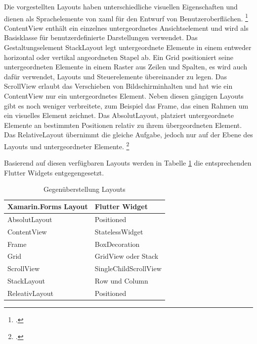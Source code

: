 Die vorgestellten Layouts haben  unterschiedliche visuellen Eigenschaften und dienen als Sprachelemente von \ac{xaml} für den Entwurf von Benutzeroberflächen.  \footcitetext[Abbildung in Anlehnung an][Abgerufen am \today]{MicrosoftXamLayouts2018} \glq ContentView\grq{} enthält ein einzelnes untergeordnetes Ansichtselement und wird als Basisklasse für benutzerdefinierte Darstellungen verwendet.  Das Gestaltungselement \glq StackLayout\grq{} legt untergeordnete Elemente in einem entweder horizontal oder vertikal angeordneten Stapel ab.  Ein \glq Grid\grq{} positioniert seine untergeordneten Elemente in einem Raster aus Zeilen und Spalten,  es wird auch dafür verwendet,  Layouts und Steuerelemente übereinander zu legen.  Das \glq ScrollView\grq{} erlaubt das Verschieben von Bildschirminhalten und hat wie ein \glq ContentView\grq{} nur ein untergeordnetes Element.  
Neben diesen gängigen Layouts gibt es noch weniger verbreitete,  zum Beispiel  das \glq  Frame\grq{}, das einen Rahmen um ein visuelles Element zeichnet.  Das \glq AbsolutLayout\grq{},  platziert untergeordnete Elemente an bestimmten Positionen relativ zu ihrem übergeordneten Element.  Das \glq RelativeLayout\grq{} übernimmt die gleiche Aufgabe,  jedoch nur auf der Ebene des Layouts und untergeordneter Elemente. \footcite[Vgl.][Abgerufen am \today]{MicrosoftXamLayouts2018}

Basierend auf diesen verfügbaren Layouts werden in Tabelle \ref{tab:XamLayouts} die entsprechenden Flutter Widgets entgegengesetzt.  

\begin{table}[!ht]
\begin{tabularx}{\textwidth}{X|X}
   \textbf{Xamarin.Forms Layout} & \textbf{Flutter Widget}  \\
\hline
	AbsolutLayout       		&  Positioned	 			\\ 
	ContentView       		&  StatelessWidget	 			\\ 
	Frame       					&  BoxDecoration     	 			\\ 
	Grid            				&  GridView oder Stack		\\ 
	ScrollView            		&  SingleChildScrollView		\\ 
	StackLayout       		&  Row und Column  	 			\\ 
	ReleativLayout           &  Positioned		\\ 

\end{tabularx}
\caption{Gegenüberstellung Layouts}
 \label{tab:XamLayouts}
\end{table}

